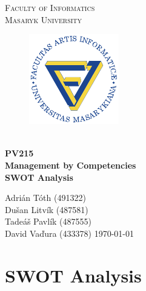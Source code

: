 \documentclass[11pt,a4paper]{article}
\begin{document}
\begin{titlepage}
    \begin{center}
        \Huge{
            \textsc{
                Faculty of Informatics\\
                \hspace{25px}Masaryk University
            }
        }
        \vspace{50px}
        \begin{figure}[!h]
            \centering
            \includegraphics[scale=3]{muni-fi-logo.pdf}
        \end{figure}
        \\[15mm]
        \Huge{
            \textbf{
                PV215
            }
        }
        \\[1.5mm]
        \huge{
            \textbf{
                Management by Competencies
            }
        }
        \\[2.5em]
        \LARGE{
            \textbf{
                SWOT Analysis
            }
        }
        \vfill
    \end{center}
        \Large{
            Adrián Tóth (491322)\\
            Dušan Litvík (487581)\\
            Tadeáš Pavlík (487555)\\
            David Vaďura (433378) \hfill \today
        }

\end{titlepage}

\setlength{\parskip}{0pt}
    \hypersetup{hidelinks}\tableofcontents
\setlength{\parskip}{0pt}

\newpage

\section{SWOT Analysis}
\end{document}
